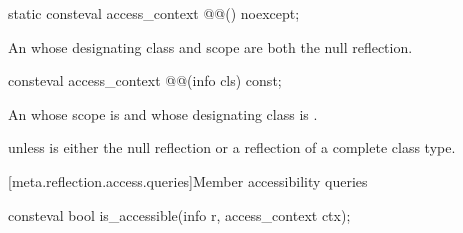 \begin{itemdecl}
static consteval access_context @@() noexcept;
\end{itemdecl}

\begin{itemdescr}
\pnum
\returns
An  whose designating class and scope
are both the null reflection.
\end{itemdescr}

\begin{itemdecl}
consteval access_context @@(info cls) const;
\end{itemdecl}

\begin{itemdescr}
\pnum
\returns
An  whose scope is 
and whose designating class is .

\pnum
\throws
{} unless
 is either the null reflection
or a reflection of a complete class type.
\end{itemdescr}

[meta.reflection.access.queries]{Member accessibility queries}

%
\begin{itemdecl}
consteval bool is_accessible(info r, access_context ctx);
\end{itemdecl}

